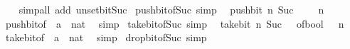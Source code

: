\begin{isabellebody}
%
\isadelimproof
\ \ %
\endisadelimproof
%
\isatagproof
{}\isamarkupfalse%
\ {\isacharparenleft}{\kern0pt}simp{\isacharunderscore}{\kern0pt}all\ add{\isacharcolon}{\kern0pt}\ unset{\isacharunderscore}{\kern0pt}bit{\isacharunderscore}{\kern0pt}Suc{\isacharparenright}{\kern0pt}%
\endisatagproof
{\isafoldproof}%
%
\isadelimproof
\isanewline
%
\endisadelimproof
\isanewline
{}\isamarkupfalse%
\ push{\isacharunderscore}{\kern0pt}bit{\isacharunderscore}{\kern0pt}of{\isacharunderscore}{\kern0pt}Suc{\isacharunderscore}{\kern0pt}{}\ {\isacharbrackleft}{\kern0pt}simp{\isacharbrackright}{\kern0pt}{\isacharcolon}{\kern0pt}\isanewline
\ \ {\isacartoucheopen}push{\isacharunderscore}{\kern0pt}bit\ n\ {\isacharparenleft}{\kern0pt}Suc\ {}{\isacharparenright}{\kern0pt}\ {\isacharequal}{\kern0pt}\ {}\ {\isacharcircum}{\kern0pt}\ n{\isacartoucheclose}\isanewline
%
\isadelimproof
\ \ %
\endisadelimproof
%
\isatagproof
{}\isamarkupfalse%
\ push{\isacharunderscore}{\kern0pt}bit{\isacharunderscore}{\kern0pt}of{\isacharunderscore}{\kern0pt}{}\ {\isacharbrackleft}{\kern0pt}\ {\isacharquery}{\kern0pt}{\isacharprime}{\kern0pt}a\ {\isacharequal}{\kern0pt}\ nat{\isacharbrackright}{\kern0pt}\ \isamarkupfalse%
\ simp%
\endisatagproof
{\isafoldproof}%
%
\isadelimproof
\isanewline
%
\endisadelimproof
\isanewline
{}\isamarkupfalse%
\ take{\isacharunderscore}{\kern0pt}bit{\isacharunderscore}{\kern0pt}of{\isacharunderscore}{\kern0pt}Suc{\isacharunderscore}{\kern0pt}{}\ {\isacharbrackleft}{\kern0pt}simp{\isacharbrackright}{\kern0pt}{\isacharcolon}{\kern0pt}\isanewline
\ \ {\isacartoucheopen}take{\isacharunderscore}{\kern0pt}bit\ n\ {\isacharparenleft}{\kern0pt}Suc\ {}{\isacharparenright}{\kern0pt}\ {\isacharequal}{\kern0pt}\ of{\isacharunderscore}{\kern0pt}bool\ {\isacharparenleft}{\kern0pt}{}\ {\isacharless}{\kern0pt}\ n{\isacharparenright}{\kern0pt}{\isacartoucheclose}\isanewline
%
\isadelimproof
\ \ %
\endisadelimproof
%
\isatagproof
{}\isamarkupfalse%
\ take{\isacharunderscore}{\kern0pt}bit{\isacharunderscore}{\kern0pt}of{\isacharunderscore}{\kern0pt}{}\ {\isacharbrackleft}{\kern0pt}\ {\isacharquery}{\kern0pt}{\isacharprime}{\kern0pt}a\ {\isacharequal}{\kern0pt}\ nat{\isacharbrackright}{\kern0pt}\ \isamarkupfalse%
\ simp%
\endisatagproof
{\isafoldproof}%
%
\isadelimproof
\isanewline
%
\endisadelimproof
\isanewline
{}\isamarkupfalse%
\ drop{\isacharunderscore}{\kern0pt}bit{\isacharunderscore}{\kern0pt}of{\isacharunderscore}{\kern0pt}Suc{\isacharunderscore}{\kern0pt}{}\ {\isacharbrackleft}{\kern0pt}simp{\isacharbrackright}{\kern0pt}{\isacharcolon}{\kern0pt}\isanewline

\end{isabellebody}
